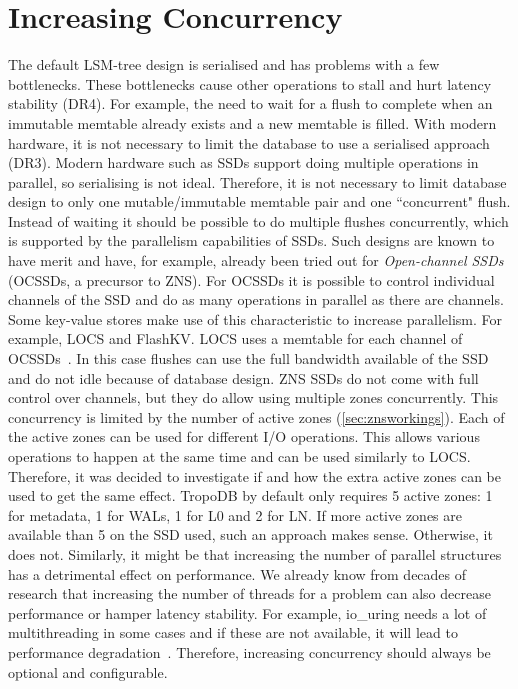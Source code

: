 \section{Increasing Concurrency}
\label{sec:desconc}
The default LSM-tree design is serialised and has problems with a few bottlenecks. These bottlenecks cause other operations to stall and hurt latency stability (DR4). For example, the need to wait for a flush to complete when an immutable memtable already exists and a new memtable is filled. With modern hardware, it is not necessary to limit the database to use a serialised approach (DR3). Modern hardware such as SSDs support doing multiple operations in parallel, so serialising is not ideal. Therefore, it is not necessary to limit database design to only one mutable/immutable memtable pair and one ``concurrent" flush. Instead of waiting it should be possible to do multiple flushes concurrently, which is supported by the parallelism capabilities of SSDs. Such designs are known to have merit and have, for example, already been tried out for \textit{Open-channel SSDs} (OCSSDs, a precursor to ZNS). For OCSSDs it is possible to control individual channels of the SSD and do as many operations in parallel as there are channels. Some key-value stores make use of this characteristic to increase parallelism. For example, LOCS and FlashKV.
LOCS uses a memtable for each channel of OCSSDs~\cite{wang2014efficient}. In this case flushes can use the full bandwidth available of the SSD and do not idle because of database design. ZNS SSDs do not come with full control over channels, but they do allow using multiple zones concurrently. This concurrency is limited by the number of active zones (\autoref{sec:znsworkings}). Each of the active zones can be used for different I/O operations. This allows various operations to happen at the same time and can be used similarly to LOCS. Therefore, it was decided to investigate if and how the extra active zones can be used to get the same effect. TropoDB by default only requires 5 active zones: 1 for metadata, 1 for WALs, 1 for L0 and 2 for LN. If more active zones are available than 5 on the SSD used, such an approach makes sense. Otherwise, it does not. Similarly, it might be that increasing the number of parallel structures has a detrimental effect on performance. We already know from decades of research that increasing the number of threads for a problem can also decrease performance or hamper latency stability. For example, io\_uring needs a lot of multithreading in some cases and if these are not available, it will lead to performance degradation~\cite{didona2022understanding}. Therefore, increasing concurrency should always be optional and configurable. 

